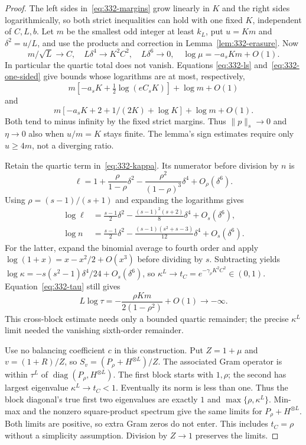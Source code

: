 \documentclass[11pt]{article}
\newcommand{\diag}{\operatorname{diag}}
\begin{document}
\begin{proof}
The left sides in~\eqref{eq:332-margins} grow linearly in $K$ and the
right sides logarithmically, so both strict inequalities can hold with
one fixed $K$, independent of $C,L,b$.
Let $m$ be the smallest odd integer at least $k_L$, put $u=Km$ and
$\delta^2=u/L$, and use the products and correction in
Lemma~\ref{lem:332-erasure}. Now
\[
 m/\sqrt L\to C,\quad L\delta^4\to K^2C^2,
 \quad L\delta^6\to0,\quad
 \log\mu=-a_sKm+O(1).
\]
In particular the quartic total does not vanish. Equations
\eqref{eq:332-ls} and~\eqref{eq:332-one-sided} give bounds whose
logarithms are at most, respectively,
\[
 m[-a_sK+\tfrac12\log(eC_sK)]+\log m+O(1)
\]
and
\[
 m[-a_sK+2+1/(2K)+\log K]+\log m+O(1).
\]
Both tend to minus infinity by the fixed strict margins. Thus
$\|p\|_s\to0$ and $\eta\to0$ also when $u/m=K$ stays finite.
The lemma's sign estimates require only $u\ge4m$, not a diverging ratio.

Retain the quartic term in~\eqref{eq:332-kappa}. Its numerator before
division by $n$ is
\[
 \ell=1+\frac{\rho}{1-\rho}\delta^2
        -\frac{\rho^2}{(1-\rho)^3}\delta^4+O_\rho(\delta^6).
\]
Using $\rho=(s-1)/(s+1)$ and expanding the logarithms gives
\begin{align*}
 \log\ell&=\frac{s-1}{2}\delta^2
       -\frac{(s-1)^2(s+2)}8\delta^4+O_s(\delta^6),\\
 \log n&=\frac{s-1}{2}\delta^2
       -\frac{(s-1)(s^2+s-3)}{12}\delta^4+O_s(\delta^6).
\end{align*}
For the latter, expand the binomial average to fourth order and apply
$\log(1+x)=x-x^2/2+O(x^3)$ before dividing by $s$.
Subtracting yields
$\log\kappa=-s(s^2-1)\delta^4/24+O_s(\delta^6)$, so
$\kappa^L\to t_C=e^{-\gamma_\rho K^2C^2}\in(0,1)$.
Equation~\eqref{eq:332-tau} still gives
\[
 L\log\tau=-\frac{\rho Km}{2(1-\rho^2)}+O(1)\longrightarrow-\infty.
\]
This cross-block estimate needs only a bounded quartic remainder;
the precise $\kappa^L$ limit needed the vanishing sixth-order remainder.

Use no balancing coefficient $c$ in this construction. Put $Z=1+\mu$
and $v=(1+R)/Z$, so $S_v=(P_\rho+H^{\otimes L})/Z$.
The associated Gram operator is within $\tau^L$ of
$\diag(P_\rho,H^{\otimes L})$. The first block starts with
$1,\rho$; the second has largest eigenvalue $\kappa^L\to t_C<1$.
Eventually its norm is less than one. Thus the block diagonal's true
first two eigenvalues are exactly $1$ and $\max\{\rho,\kappa^L\}$.
Min-max and the nonzero square-product spectrum give the same limits
for $P_\rho+H^{\otimes L}$. Both limits are positive, so extra Gram
zeros do not enter. This includes $t_C=\rho$ without a simplicity
assumption. Division by $Z\to1$ preserves the limits.


\end{proof}
\end{document}
